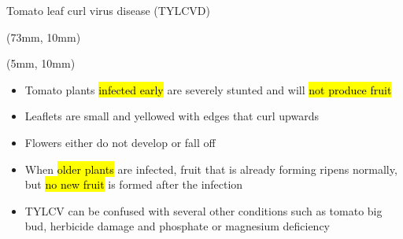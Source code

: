 \begin{frame}{Tomato leaf curl virus disease (TYLCVD)}
    \begin{textblock*}{65mm}(73mm, 10mm)
    \end{textblock*}
    \begin{textblock*}{60mm}(5mm, 10mm)
        \begin{greenbox}{}
            \begin{itemize}[<+->]
                \item
                    Tomato plants \hl{infected early}
                    are severely stunted and will
                    \hl{not produce fruit}
                \item
                    Leaflets are small and yellowed 
                    with edges that curl upwards
                \item
                    Flowers either do not develop or 
                    fall off
                \item
                    When \hl{older plants} are 
                    infected, fruit that is already
                    forming ripens normally, but 
                    \hl{no new fruit} 
                    is formed after the infection
                \item
                    TYLCV can be confused with several 
                    other conditions such as tomato big 
                    bud, herbicide damage and phosphate 
                    or magnesium deficiency
            \end{itemize}
        \end{greenbox}
    \end{textblock*}
 \end{frame}
